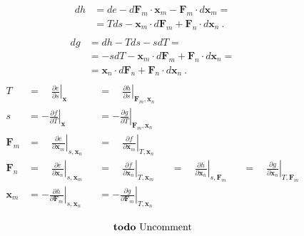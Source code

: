 \documentclass[letterpaper,10pt,english]{jupyterBook}
\begin{document}
\begin{equation*}
\begin{split}\begin{aligned}
  d h 
  & = de - d \mathbf{F}_m \cdot \mathbf{x}_m - \mathbf{F}_m \cdot d \mathbf{x}_m = \\
  & = T d s - \mathbf{x}_m \cdot d \mathbf{F}_m + \mathbf{F}_n \cdot d \mathbf{x}_n \ .
\end{aligned}\end{split}
\end{equation*}
\sphinxAtStartPar
{}
\begin{equation*}
\begin{split}\begin{aligned}
  d g 
  & = dh - T ds - s dT = \\
  & = - s  dT - \mathbf{x}_m \cdot d \mathbf{F}_m + \mathbf{F}_n \cdot d \mathbf{x}_n = \\
  & = \mathbf{x}_n \cdot d \mathbf{F}_n + \mathbf{F}_n \cdot d \mathbf{x}_n \ .
\end{aligned}\end{split}
\end{equation*}
\sphinxAtStartPar
{}
\begin{equation*}
\begin{split}\begin{aligned}
 T & = \quad \left.\frac{\partial e}{\partial s}\right|_{\mathbf{x}} && = \quad \left.\frac{\partial h}{\partial s}\right|_{\mathbf{F}_m,\mathbf{x}_n} \\
 s & =     - \left.\frac{\partial f}{\partial T}\right|_{\mathbf{x}} && =     - \left.\frac{\partial g}{\partial T}\right|_{\mathbf{F}_m,\mathbf{x}_n} \\
 \mathbf{F}_m & = \quad \left.\frac{\partial e}{\partial \mathbf{x}_m}\right|_{s,\mathbf{x}_n} && = \quad \left.\frac{\partial f}{\partial \mathbf{x}_m}\right|_{T,\mathbf{x}_n} \\
 \mathbf{F}_n & = \quad  \left.\frac{\partial e}{\partial \mathbf{x}_n}\right|_{s,\mathbf{x}_m} && = \quad \left.\frac{\partial f}{\partial \mathbf{x}_n}\right|_{T,\mathbf{x}_m} && = \quad  \left.\frac{\partial h}{\partial \mathbf{x}_n}\right|_{s,\mathbf{F}_m} && = \quad \left.\frac{\partial g}{\partial \mathbf{x}_n}\right|_{T,\mathbf{F}_m} \\
 \mathbf{x}_m & = -\left.\frac{\partial h}{\partial \mathbf{F}_m}\right|_{s,\mathbf{x}_n} && =- \left.\frac{\partial g}{\partial \mathbf{F}_m}\right|_{T,\mathbf{x}_n}\\
\end{aligned}\end{split}
\end{equation*}
\sphinxAtStartPar
{}
\begin{equation*}
\begin{split}\text{\textbf{todo} Uncomment}\end{split}
\end{equation*}
\end{document}
